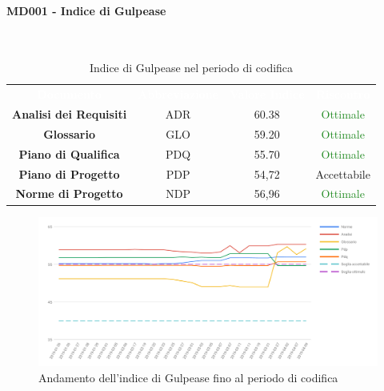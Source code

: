 \paragraph{MD001 - Indice di Gulpease}\mbox{}\\[0,3cm]
\begin{table}[H]
	\centering
	\begin{tabular}{cccc}
	\rowcolor{greySWEight}
	\textcolor{white}{\textbf{Documento}} & 
	\textcolor{white}{\textbf{Abbreviazione}} &
	\textcolor{white}{\textbf{Valore Indice}}&
	\textcolor{white}{\textbf{Riscontro}}\\
	
	\textbf{Analisi dei Requisiti} & ADR & 60.38 & \textcolor{ForestGreen}{Ottimale} \\
	\textbf{Glossario} & GLO & 59.20 & \textcolor{ForestGreen}{Ottimale} \\
	\textbf{Piano di Qualifica} & PDQ & 55.70 & \textcolor{ForestGreen}{Ottimale} \\
	\textbf{Piano di Progetto} & PDP & 54,72 & \textcolor{YellowOrange}{Accettabile} \\
	\textbf{Norme di Progetto} & NDP & 56,96 & \textcolor{ForestGreen}{Ottimale} \\

	\end{tabular}
	\caption{Indice di Gulpease nel periodo di codifica}
\end{table}

\begin{figure}[H]
	\includegraphics[width=1\linewidth]{sez/App_Esito/Qualifica/graph/gulpeaseRQ.pdf}
	\caption{Andamento dell'indice di Gulpease fino al periodo di codifica}
\end{figure}